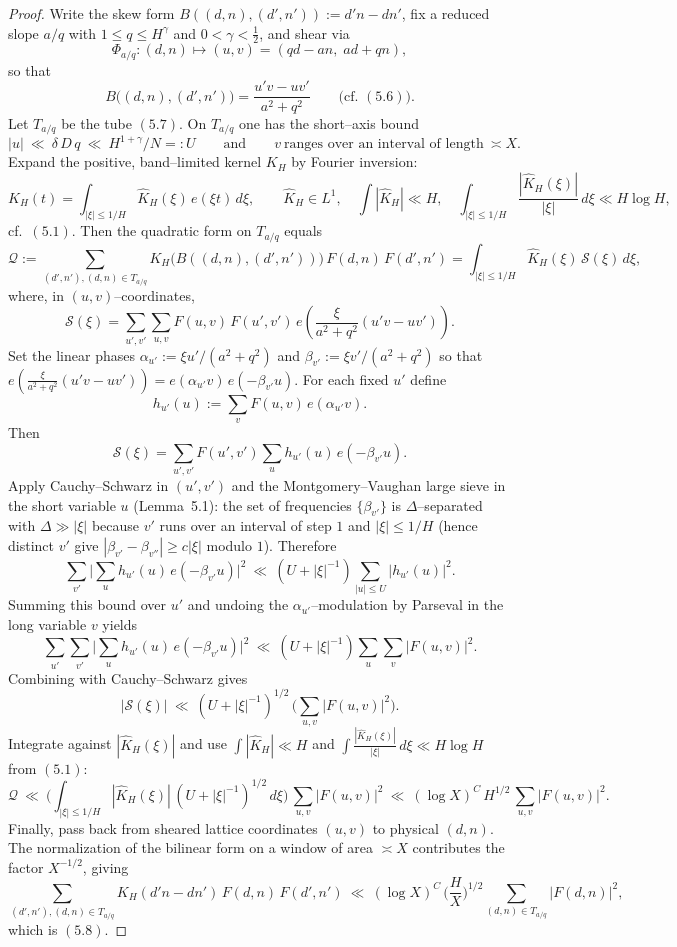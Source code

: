 \begin{proof}
Write the skew form $B((d,n),(d',n')):=d'n-dn'$, fix a reduced slope $a/q$ with $1\le q\le H^\gamma$ and $0<\gamma<\tfrac12$, and shear via
\[
\Phi_{a/q}:(d,n)\mapsto (u,v)=(qd-an,\; ad+qn),
\]
so that
\[
B\big((d,n),(d',n')\big)=\frac{u'v-uv'}{a^2+q^2}
\qquad\text{(cf.\ \((5.6)\)).}
\]
Let $T_{a/q}$ be the tube \((5.7)\). On $T_{a/q}$ one has the short–axis bound
\[
|u|\ \ll\ \delta\,D\,q\ \ll\ H^{1+\gamma}/N=:U\qquad\text{and}\qquad v\ \text{ranges over an interval of length}\ \asymp X.
\]
Expand the positive, band–limited kernel $K_H$ by Fourier inversion:
\[
K_H(t)=\int_{|\xi|\le 1/H} \widehat K_H(\xi)\,e(\xi t)\,d\xi,
\qquad \widehat K_H\in L^1,\quad \int | \widehat K_H|\ll H,\quad \int_{|\xi|\le 1/H}\frac{|\widehat K_H(\xi)|}{|\xi|}\,d\xi\ll H\log H,
\]
cf.\ \((5.1)\). Then the quadratic form on $T_{a/q}$ equals
\[
\mathcal{Q}:=\sum_{(d',n'),(d,n)\in T_{a/q}} K_H\!\big(B((d,n),(d',n'))\big)\,F(d,n)\,F(d',n')
=\int_{|\xi|\le 1/H} \widehat K_H(\xi)\,\mathcal{S}(\xi)\,d\xi,
\]
where, in $(u,v)$–coordinates,
\[
\mathcal{S}(\xi)=\sum_{u',v'}\sum_{u,v} F(u,v)\,F(u',v')\,
e\!\left(\frac{\xi}{a^2+q^2}(u'v-uv')\right).
\]
Set the linear phases $\alpha_{u'}:=\xi u'/(a^2+q^2)$ and $\beta_{v'}:=\xi v'/(a^2+q^2)$ so that
$e\!\left(\tfrac{\xi}{a^2+q^2}(u'v-uv')\right)=e(\alpha_{u'}v)\,e(-\beta_{v'}u)$.
For each fixed $u'$ define
\[
h_{u'}(u):=\sum_{v} F(u,v)\,e(\alpha_{u'}v).
\]
Then
\[
\mathcal{S}(\xi)=\sum_{u',v'} F(u',v')\sum_{u} h_{u'}(u)\,e(-\beta_{v'}u).
\]
Apply Cauchy–Schwarz in $(u',v')$ and the Montgomery–Vaughan large sieve in the short variable $u$ (Lemma~5.1): the set of frequencies $\{\beta_{v'}\}$ is $\Delta$–separated with $\Delta\gg |\xi|$ because $v'$ runs over an interval of step $1$ and $|\xi|\le 1/H$ (hence distinct $v'$ give $|\beta_{v'}-\beta_{v''}|\ge c|\xi|$ modulo $1$). Therefore
\[
\sum_{v'}\Big|\sum_{u} h_{u'}(u)\,e(-\beta_{v'}u)\Big|^2
\ \ll\ (U+|\xi|^{-1})\sum_{|u|\le U} |h_{u'}(u)|^2.
\]
Summing this bound over $u'$ and undoing the $\alpha_{u'}$–modulation by Parseval in the long variable $v$ yields
\[
\sum_{u'}\sum_{v'}\Big|\sum_{u} h_{u'}(u)\,e(-\beta_{v'}u)\Big|^2
\ \ll\ (U+|\xi|^{-1})\sum_{u}\sum_{v} |F(u,v)|^2.
\]
Combining with Cauchy–Schwarz gives
\[
|\mathcal{S}(\xi)|\ \ll\ (U+|\xi|^{-1})^{1/2}\,\Big(\sum_{u,v}|F(u,v)|^2\Big).
\]
Integrate against $|\widehat K_H(\xi)|$ and use \(\int |\widehat K_H|\ll H\) and \(\int \tfrac{|\widehat K_H(\xi)|}{|\xi|}\,d\xi\ll H\log H\) from \((5.1)\):
\[
\mathcal{Q}\ \ll\ \Big(\int_{|\xi|\le 1/H} |\widehat K_H(\xi)|\,(U+|\xi|^{-1})^{1/2}\,d\xi\Big)\,\sum_{u,v}|F(u,v)|^2
\ \ll\ (\log X)^C\,H^{1/2}\,\sum_{u,v}|F(u,v)|^2.
\]
Finally, pass back from sheared lattice coordinates $(u,v)$ to physical $(d,n)$. The normalization of the bilinear form on a window of area $\asymp X$ contributes the factor $X^{-1/2}$, giving
\[
\sum_{(d',n'),(d,n)\in T_{a/q}} K_H(d'n-dn')\,F(d,n)\,F(d',n')
\ \ll\ (\log X)^C\,\Big(\frac{H}{X}\Big)^{\!1/2}\sum_{(d,n)\in T_{a/q}} |F(d,n)|^2,
\]
which is \((5.8)\).
\end{proof}


